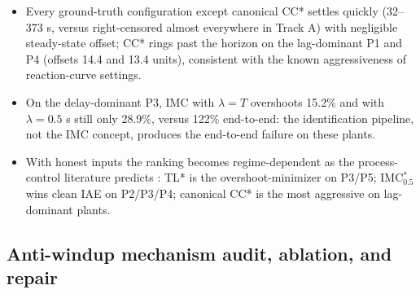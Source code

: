 \documentclass[10pt,twocolumn]{article}
\begin{document}
\begin{itemize}
\item Every ground-truth configuration except canonical CC* settles quickly (32--373 s, versus right-censored almost everywhere in Track A) with negligible steady-state offset; CC* rings past the horizon on the lag-dominant P1 and P4 (offsets 14.4 and 13.4 units), consistent with the known aggressiveness of reaction-curve settings.
\item On the delay-dominant P3, IMC with $\lambda = T$ overshoots 15.2\% and with $\lambda = 0.5$ s still only 28.9\%, versus 122\% end-to-end: the identification pipeline, not the IMC concept, produces the end-to-end failure on these plants.
\item With honest inputs the ranking becomes regime-dependent as the process-control literature predicts \cite{skogestad2003, astrom2006}: TL* is the overshoot-minimizer on P3/P5; IMC$_{0.5}^*$ wins clean IAE on P2/P3/P4; canonical CC* is the most aggressive on lag-dominant plants.
\end{itemize}

\begin{table}[t]
\centering
\caption{Track B: tuning rules supplied ground-truth parameters (Table~\ref{tab:factors}); settling is 2\%-band, ``$>$1800'' right-censored. The last two columns give the steady-state offset with the shipped anti-windup limiter off (the Track B baseline) and on, isolating the protection factor within the track.}
\label{tab:trackb}
\small
\setlength{\tabcolsep}{4pt}

\end{table}

\subsection{Anti-windup mechanism audit, ablation, and repair}
\label{sec:awaudit}
\end{document}
